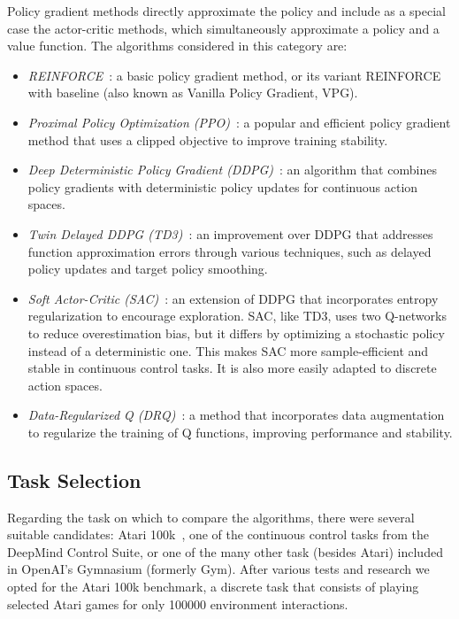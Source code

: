 Policy gradient methods directly approximate the policy and include as a special case the actor-critic methods, which simultaneously approximate a policy and a value function. The algorithms considered in this category are:
\begin{itemize}
	\item \textit{REINFORCE}~\cite[Chapter~13]{sutton:rl}: a basic policy gradient method, or its variant REINFORCE with baseline (also known as Vanilla Policy Gradient, VPG).
	\item \textit{Proximal Policy Optimization (PPO)}~\cite{schulman:ppo}: a popular and efficient policy gradient method that uses a clipped objective to improve training stability.
	\item \textit{Deep Deterministic Policy Gradient (DDPG)}~\cite{lillicrap:ddpg}: an algorithm that combines policy gradients with deterministic policy updates for continuous action spaces.
	\item \textit{Twin Delayed DDPG (TD3)~}\cite{fujimoto:td3}: an improvement over DDPG that addresses function approximation errors through various techniques, such as delayed policy updates and target policy smoothing.
	\item \textit{Soft Actor-Critic (SAC)}~\cite{haarnoja:sac}: an extension of DDPG that incorporates entropy regularization to encourage exploration. SAC, like TD3, uses two Q-networks to reduce overestimation bias, but it differs by optimizing a stochastic policy instead of a deterministic one. This makes SAC more sample-efficient and stable in continuous control tasks. It is also more easily adapted to discrete action spaces.
	\item \textit{Data-Regularized Q (DRQ)}~\cite{kostrikov:drq}: a method that incorporates data augmentation to regularize the training of Q functions, improving performance and stability.
\end{itemize}


\subsection{Task Selection}
\label{subsec:task_selection}

Regarding the task on which to compare the algorithms, there were several suitable candidates: Atari 100k~\cite{kaiser:atari100k}, one of the continuous control tasks from the DeepMind Control Suite, or one of the many other task (besides Atari) included in OpenAI's Gymnasium (formerly Gym). After various tests and research we opted for the Atari 100k benchmark, a discrete task that consists of playing selected Atari games for only \num{100000} environment interactions.

